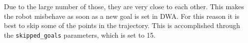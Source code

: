 \documentclass[11pt,a4paper]{article}
\begin{document}
Due to the large number of those, they are very close to each other. This makes the robot misbehave as soon as
a new goal is set in DWA. For this reason it is best to skip some of the points in the trajectory.
This is accomplished through the \texttt{skipped\_goals} parameters, which is set to 15.\\

\begin{figure}[H]
    \centering
    \quad
\end{figure}
\end{document}
